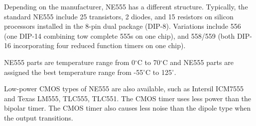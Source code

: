 \documentclass[a4paper]{report}
\begin{document}
        \linebreak
        \par Depending on the manufacturer, NE555 has a different structure. Typically, the standard 
        NE555 include 25 transistors, 2 diodes, and 15 resistors on silicon processors installed in the 
        8-pin dual package (DIP-8). Variations include 556 (one DIP-14 combining tow complete 555s on one chip), 
        and 558/559 (both DIP-16 incorporating four reduced function timers on one chip).
        \linebreak 
        \par NE555 parts are temperature range from 0$^{\circ}$C to 70$^{\circ}$C and NE555 parts are 
        assigned the best temperature range from -55$^{\circ}$C to 125$^{\circ}$.
        \linebreak
        \par Low-power CMOS types of NE555 are also available, such as Intersil ICM7555 and Texas LM555, 
        TLC555, TLC551. The CMOS timer uses less power than the bipolar timer. The CMOS timer also causes 
        less noise than the dipole type when the output transitions.
\end{document}
